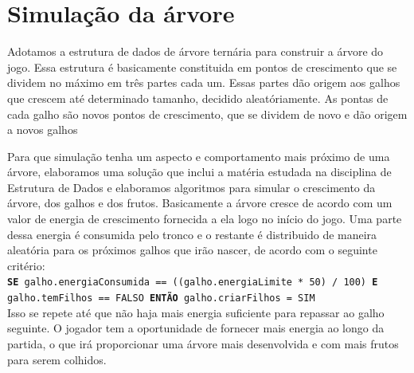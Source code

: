 \documentclass[12pt]{article}
\begin{document}
\section{Simula\c c\~ao da \'arvore}

Adotamos a estrutura de dados de \'arvore tern\'aria para construir a \'arvore do jogo. Essa estrutura \'e basicamente constituida
em pontos de crescimento que se dividem no m\'aximo em tr\^es partes cada um. Essas partes d\~ao origem aos galhos que crescem at\'e
determinado tamanho, decidido aleat\'oriamente. As pontas de cada galho s\~ao novos pontos de crescimento,
que se dividem de novo e d\~ao origem a novos galhos

Para que simula\c c\~ao tenha um aspecto e comportamento mais pr\'oximo de uma \'arvore, elaboramos uma solu\c c\~ao que inclui
a mat\'eria estudada na disciplina de Estrutura de Dados e elaboramos algoritmos para simular o crescimento da \'arvore,
dos galhos e dos frutos. Basicamente a \'arvore cresce de acordo com um valor de energia de crescimento fornecida
a ela logo no in\'icio do jogo. Uma parte dessa energia \'e consumida pelo tronco e o restante \'e distribuido
de maneira aleat\'oria para os pr\'oximos galhos que ir\~ao nascer, de acordo com o seguinte crit\'erio: \\

 \texttt{\footnotesize{\textbf{SE} galho.energiaConsumida == ((galho.energiaLimite * 50) / 100) \textbf{E} galho.temFilhos == FALSO 
        \textbf{ENT\~AO} galho.criarFilhos = SIM}} \\


Isso se repete at\'e que n\~ao haja mais energia suficiente
para repassar ao galho seguinte. O jogador tem a oportunidade de fornecer mais energia ao longo da partida, o que
ir\'a proporcionar uma \'arvore mais desenvolvida e com mais frutos para serem colhidos.
\end{document}
